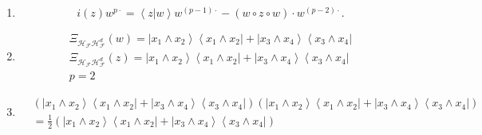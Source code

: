\documentclass[aps,preprint]{revtex4}%
\begin{document}
\begin{enumerate}
\item
\begin{equation}
i\left(  z\right)  w^{p\cdot}=\left\langle \left.  z\right\vert w\right\rangle
w^{\left(  p-1\right)  \cdot}-\left(  w\circ z\circ w\right)  \cdot w^{\left(
p-2\right)  \cdot}.
\end{equation}


\item
\begin{gather}
\Xi_{\mathcal{H}_{\mathcal{F}}\mathcal{H}_{\mathcal{F}}^{d}}\left(  w\right)
=\left\vert x_{1}\wedge x_{2}\right\rangle \left\langle x_{1}\wedge
x_{2}\right\vert +\left\vert x_{3}\wedge x_{4}\right\rangle \left\langle
x_{3}\wedge x_{4}\right\vert \\
\Xi_{\mathcal{H}_{\mathcal{F}}\mathcal{H}_{\mathcal{F}}^{d}}\left(  z\right)
=\left\vert x_{1}\wedge x_{2}\right\rangle \left\langle x_{1}\wedge
x_{2}\right\vert +\left\vert x_{3}\wedge x_{4}\right\rangle \left\langle
x_{3}\wedge x_{4}\right\vert \\
p=2
\end{gather}


\item
\begin{align}
&  \left(  \left\vert x_{1}\wedge x_{2}\right\rangle \left\langle x_{1}\wedge
x_{2}\right\vert +\left\vert x_{3}\wedge x_{4}\right\rangle \left\langle
x_{3}\wedge x_{4}\right\vert \right)  \left(  \left\vert x_{1}\wedge
x_{2}\right\rangle \left\langle x_{1}\wedge x_{2}\right\vert +\left\vert
x_{3}\wedge x_{4}\right\rangle \left\langle x_{3}\wedge x_{4}\right\vert
\right) \\
&  =\frac{1}{2}\left(  \left\vert x_{1}\wedge x_{2}\right\rangle \left\langle
x_{1}\wedge x_{2}\right\vert +\left\vert x_{3}\wedge x_{4}\right\rangle
\left\langle x_{3}\wedge x_{4}\right\vert \right)
\end{align}



\end{enumerate}
\end{document}
